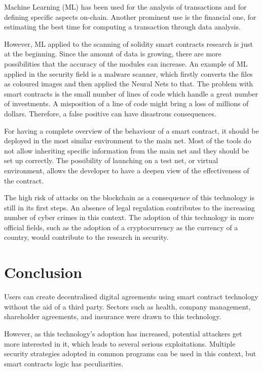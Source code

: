 \documentclass[a4paper,sigconf, language=french,
language=german, language=spanish, language=english]{acmart}
\begin{document}
Machine Learning (ML) has been used for the analysis of transactions and for defining specific aspects on-chain. Another prominent use is the financial one, for estimating the best time for computing a transaction through data analysis.

However, ML applied to the scanning of solidity smart contracts research is just at the beginning. Since the amount of data is growing, there are more possibilities that the accuracy of the modules can increase.  An example of ML applied in the security field is a malware scanner, which firstly converts the files as coloured images and then applied the Neural Nets to that. The problem with smart contracts is the small number of lines of code which handle a great number of investments. A misposition of a line of code might bring a loss of millions of dollars. Therefore, a false positive can have disastrous consequences.

For having a complete overview of the behaviour of a smart contract, it should be deployed in the most similar environment to the main net. Most of the tools do not allow inheriting specific information from the main net and they should be set up correctly. 
The possibility of launching on a test net, or virtual environment, allows the developer to have a deepen view of the effectiveness of the contract.

The high risk of attacks on the blockchain as a consequence of this technology is still in its first steps. An absence of legal regulation contributes to the increasing number of cyber crimes in this context. The adoption of this technology in more official fields, such as the adoption of a cryptocurrency as the currency of a country, would contribute to the research in security.

\section{Conclusion}
\label{Conclusion}
Users can create decentralised digital agreements using smart contract technology without the aid of a third party.
Sectors such as health, company management, shareholder agreements, and insurance were drawn to this technology.

However, as this technology's adoption has increased, potential attackers get more interested in it, which leads to several serious exploitations. 
Multiple security strategies adopted in common programs can be used in this context, but smart contracts logic has peculiarities.
\end{document}
